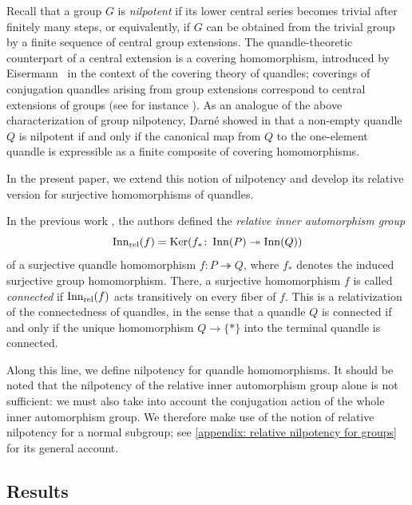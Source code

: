 Recall that a group $G$ is \emph{nilpotent} if its lower central series becomes trivial after finitely many steps, or equivalently, if $G$ can be obtained from the trivial group by a finite sequence of central group extensions.
The quandle-theoretic counterpart of a central extension is a covering homomorphism, introduced by Eisermann~\cite{eisermann_2014_quandle_coverings_and_their_galois_correspondence} in the context of the covering theory of quandles; coverings of conjugation quandles arising from group extensions correspond to central extensions of groups (see for instance \cite[Proposition 5.2]{preprint_yuki_tomoki_2026_relativization_of_symmetries_on_quandles}).
As an analogue of the above characterization of group nilpotency, Darn\'e showed in \cite[Theorem 2.13]{darne_2026_nilpotent_quandles} that a non-empty quandle $Q$ is nilpotent if and only if the canonical map from $Q$ to the one-element quandle is expressible as a finite composite of covering homomorphisms.

In the present paper, we extend this notion of nilpotency and develop its relative version for surjective homomorphisms of quandles.

In the previous work \cite{preprint_yuki_tomoki_2026_relativization_of_symmetries_on_quandles}, the authors defined the \emph{relative inner automorphism group}
\[ \operatorname{Inn_{rel}}(f) = \operatorname{Ker}(f_*\colon \operatorname{Inn}(P) \twoheadrightarrow \operatorname{Inn}(Q)) \]
of a surjective quandle homomorphism $f\colon P \twoheadrightarrow Q$, where $f_*$ denotes the induced surjective group homomorphism.
There, a surjective homomorphism $f$ is called \emph{connected} if $\operatorname{Inn_{rel}}(f)$ acts transitively on every fiber of $f$. 
This is a relativization of the connectedness of quandles, in the sense that a quandle $Q$ is connected if and only if the unique homomorphism $Q\to\{\ast\}$ into the terminal quandle is connected.





Along this line, we define nilpotency for quandle homomorphisms.
It should be noted that the nilpotency of the relative inner automorphism group alone is not sufficient: we must also take into account the conjugation action of the whole inner automorphism group. We therefore make use of the notion of relative nilpotency for a normal subgroup; see \cref{appendix: relative nilpotency for groups} for its general account.


\subsection{Results}
\label{subsection: results in introduction}


